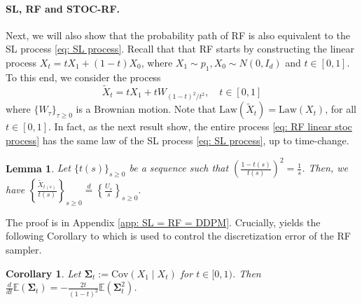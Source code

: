 \documentclass{article}
\theoremstyle{plain}
\newtheorem{lemma}[theorem]{Lemma}
\newtheorem{corollary}[theorem]{Corollary}
\theoremstyle{definition}
\theoremstyle{remark}
\def\bbE{\mathbb{E}}
\def\bSigma{{\boldsymbol\Sigma}}
\def\Cov{\text{Cov}}
\newcommand{\bc}[1]{\left\{{#1}\right\}}
\newcommand{\br}[1]{\left({#1}\right)}
\newcommand{\Law}{\text{Law}}
\begin{document}
\paragraph{SL, RF and STOC-RF.} Next, we will also show that the probability path of RF is also equivalent to the SL process \eqref{eq: SL process}. Recall that that RF starts by constructing the linear process $X_t = t X_1 + (1-t)X_0$, where $X_1 \sim p_1, X_0 \sim N(0, I_d)$ and $t \in [0,1]$. To this end, we consider the process 
\begin{equation}
    \label{eq: RF linear stoc process}
    \tilde X_t = t X_1 +  t W_{(1-t)^2/t^2}, \quad t \in [0,1]
\end{equation}
where $\{W_\tau\}_{\tau \ge 0}$ is a Brownian motion. Note that $\Law(\tilde X_t) = \Law (X_t)$, for all $t \in [0,1]$. In fact, as the next result show, the entire process \eqref{eq: RF linear stoc process} has the same law of the SL process \eqref{eq: SL process}, up to time-change.
\begin{lemma}
\label{lemma: SL and RF are equivalent}
    Let $\{t(s)\}_{s\ge0}$ be a sequence such that $\br{\frac{1 - t(s)}{t(s)}}^2 = \frac{1}{s}$. Then, we have 
    $
        \bc{\frac{\tilde X_{t(s)}}{t(s)}}_{s \ge 0} \overset{d}{=} \bc{\frac{U_s}{s}}_{s \ge 0}.
    $
\end{lemma}
The proof is in Appendix \ref{app: SL = RF = DDPM}. Crucially,  yields the following Corollary to  which is used to control the discretization error of the RF sampler.
\begin{corollary}
    \label{cor: my ddt cov version}
    Let $\bSigma_t := \Cov(X_1\mid X_t)$ for $t \in [0,1)$. Then $\frac{d}{dt} \bbE (\bSigma_t) = - \frac{2t}{(1-t)^3} \bbE(\bSigma_t^2)$.
\end{corollary}
\end{document}
